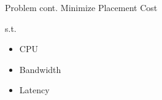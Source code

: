 \begin{frame}{Problem cont.}
    Minimize Placement Cost

    s.t.
    \begin{itemize}
        \item CPU
        \item Bandwidth
        \item Latency
    \end{itemize}
\end{frame}